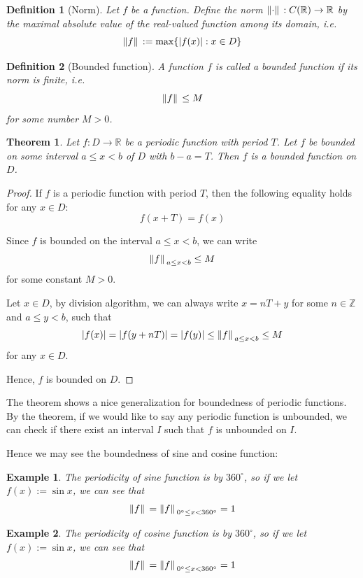 \documentclass[12pt]{article}
\newtheorem{definition}{Definition}[section]
\newtheorem*{theorem}{Theorem}
\newtheorem*{example}{Example}
\begin{document}
    \begin{definition}[Norm]
        Let $f$ be a function. Define the norm $\norm*{\cdot}:C(\mathbb{R})\to\mathbb{R}$ by the maximal absolute value of the real-valued function among its domain, i.e. \[\norm*{f}:=\max\{|f(x)|:x\in D\}\] 
    \end{definition}

    \begin{definition}[Bounded function]
        A function $f$ is called a bounded function if its norm is finite, i.e. \[\norm*{f}\leq M\] for some number $M>0$.
    \end{definition}

    \begin{theorem}
        Let $f:D\to\mathbb{R}$ be a periodic function with period $T$. Let $f$ be bounded on some interval $a\leq x < b$ of $D$ with $b-a=T$. Then $f$ is a bounded function on $D$.
    \end{theorem}

    \begin{proof}
        If $f$ is a periodic function with period $T$, then the following equality holds for any $x\in D$: \[f(x+T)=f(x)\]

        Since $f$ is bounded on the interval $a\leq x < b$, we can write \[\norm*{f}_{a\leq x< b}\leq M\] for some constant $M>0$.

        Let $x\in D$, by division algorithm, we can always write $x=nT+y$ for some $n\in \mathbb{Z}$ and $a\leq y< b$, such that \[|f(x)|=|f(y+nT)|=|f(y)|\leq \norm*{f}_{a\leq x< b}\leq M\] for any $x\in D$.

        Hence, $f$ is bounded on $D$.
    \end{proof}

    The theorem shows a nice generalization for boundedness of periodic functions. By the theorem, if we would like to say any periodic function is unbounded, we can check if there exist an interval $I$ such that $f$ is unbounded on $I$.

    Hence we may see the boundedness of sine and cosine function:

    \begin{example}
        The periodicity of sine function is by $360^\circ$, so if we let $f(x):=\sin{x}$, we can see that \[\norm*{f}=\norm*{f}_{0^\circ \leq x< 360^\circ}=1\]
    \end{example}

    \begin{example}
        The periodicity of cosine function is by $360^\circ$, so if we let $f(x):=\sin{x}$, we can see that \[\norm*{f}=\norm*{f}_{0^\circ \leq x< 360^\circ}=1\]
    \end{example}
\end{document}
